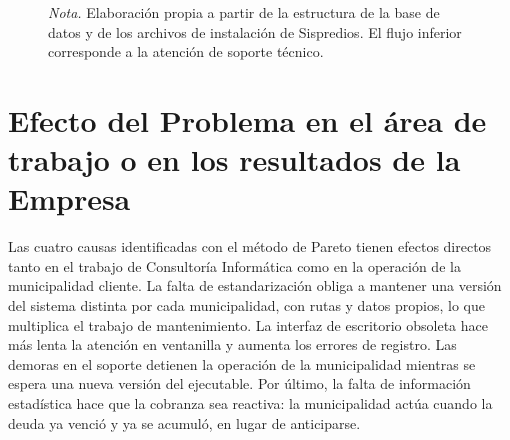 \documentclass[12pt,a4paper]{report}
\begin{document}
\begin{figure}[H]
\vspace{0.4cm}
\par\footnotesize\textit{Nota.} Elaboración propia a partir de la estructura de la base de datos y de los archivos de instalación de Sispredios. El flujo inferior corresponde a la atención de soporte técnico.
\end{figure}

\section{Efecto del Problema en el área de trabajo o en los resultados de la Empresa}

Las cuatro causas identificadas con el método de Pareto tienen efectos directos tanto en el trabajo de Consultoría Informática como en la operación de la municipalidad cliente. La falta de estandarización obliga a mantener una versión del sistema distinta por cada municipalidad, con rutas y datos propios, lo que multiplica el trabajo de mantenimiento. La interfaz de escritorio obsoleta hace más lenta la atención en ventanilla y aumenta los errores de registro. Las demoras en el soporte detienen la operación de la municipalidad mientras se espera una nueva versión del ejecutable. Por último, la falta de información estadística hace que la cobranza sea reactiva: la municipalidad actúa cuando la deuda ya venció y ya se acumuló, en lugar de anticiparse.
\end{document}
